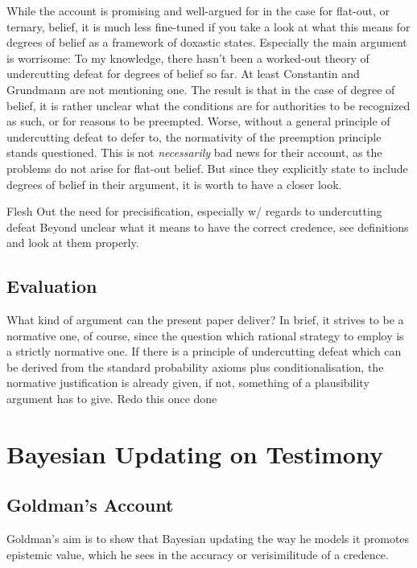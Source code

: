 \documentclass[11pt, a4paper]{scrartcl}
\renewcommand{\i}[1]{\emph{#1}}
\begin{document}
While the account is promising and well-argued for in the case for flat-out, or ternary, belief, it is much less fine-tuned if you take a look at what this means for degrees of belief as a framework of doxastic states. Especially the main argument is worrisome: To my knowledge, there hasn't been a worked-out theory of undercutting defeat for degrees of belief so far. At least Constantin and Grundmann are not mentioning one. The result is that in the case of degree of belief, it is rather unclear what the conditions are for authorities to be recognized as such, or for reasons to be preempted. Worse, without a general principle of undercutting defeat to defer to, the normativity of the preemption principle stands questioned. This is not \i{necessarily} bad news for their account, as the problems do not arise for flat-out belief. But since they explicitly state to include degrees of belief in their argument, it is worth to have a closer look.  

{\color{red} Flesh Out the need for precisification, especially w/ regards to undercutting defeat}
Beyond unclear what it means to have the correct credence, see definitions and look at them properly.

\subsection{Evaluation}

What kind of argument can the present paper deliver? In brief, it strives to be a normative one, of course, since the question which rational strategy to employ is a strictly normative one. If there is a principle of undercutting defeat which can be derived from the standard probability axioms plus conditionalisation, the normative justification is already given, if not, something of a plausibility argument has to give.
{\color{red} Redo this once done}

\section{Bayesian Updating on Testimony}

\subsection{Goldman's Account}

Goldman's aim\textcite[103--130]{Goldman1999-GOLKIA} is to show that Bayesian updating the way he models it promotes epistemic value, which he sees in the accuracy or verisimilitude of a credence. 
\end{document}
